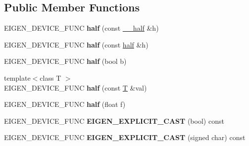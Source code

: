 \subsection*{Public Member Functions}
\begin{DoxyCompactItemize}
\item 
\mbox{\label{struct_eigen_1_1half_aec0a5f49faeb9badec14e7f8d885733e}} 
E\+I\+G\+E\+N\+\_\+\+D\+E\+V\+I\+C\+E\+\_\+\+F\+U\+NC {\bfseries half} (const \hyperlink{struct_eigen_1_1half__impl_1_1____half}{\+\_\+\+\_\+half} \&h)
\item 
\mbox{\label{struct_eigen_1_1half_a164c583ebcb7826def575cc105c8c284}} 
E\+I\+G\+E\+N\+\_\+\+D\+E\+V\+I\+C\+E\+\_\+\+F\+U\+NC {\bfseries half} (const \hyperlink{struct_eigen_1_1half}{half} \&h)
\item 
\mbox{\label{struct_eigen_1_1half_a6d3741a7999bec720162c4fc8cdf17b8}} 
E\+I\+G\+E\+N\+\_\+\+D\+E\+V\+I\+C\+E\+\_\+\+F\+U\+NC {\bfseries half} (bool b)
\item 
\mbox{\label{struct_eigen_1_1half_ad9417b03b1647ba1a11fa878d6b6f6da}} 
{\footnotesize template$<$class T $>$ }\\E\+I\+G\+E\+N\+\_\+\+D\+E\+V\+I\+C\+E\+\_\+\+F\+U\+NC {\bfseries half} (const \hyperlink{group___sparse_core___module}{T} \&val)
\item 
\mbox{\label{struct_eigen_1_1half_a9d2a0ff89919f07454e80c677bd3e4ae}} 
E\+I\+G\+E\+N\+\_\+\+D\+E\+V\+I\+C\+E\+\_\+\+F\+U\+NC {\bfseries half} (float f)
\item 
\mbox{\label{struct_eigen_1_1half_aeef3ed6d55a3eb70d1434f8576d3cfea}} 
E\+I\+G\+E\+N\+\_\+\+D\+E\+V\+I\+C\+E\+\_\+\+F\+U\+NC {\bfseries E\+I\+G\+E\+N\+\_\+\+E\+X\+P\+L\+I\+C\+I\+T\+\_\+\+C\+A\+ST} (bool) const
\item 
\mbox{\label{struct_eigen_1_1half_aa957f6c648dc3188adee73cf50682786}} 
E\+I\+G\+E\+N\+\_\+\+D\+E\+V\+I\+C\+E\+\_\+\+F\+U\+NC {\bfseries E\+I\+G\+E\+N\+\_\+\+E\+X\+P\+L\+I\+C\+I\+T\+\_\+\+C\+A\+ST} (signed char) const
\item 
\mbox{\label{struct_eigen_1_1half_ae56d5d68c54e0d8b7beab386ef2e8a0d}} 

\end{DoxyCompactItemize}
